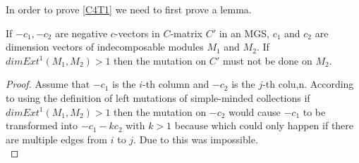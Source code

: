 \indent In order to prove \ref{C4T1} we need to first prove a lemma.
\begin{lemma}\label{C4L}
\indent If $-c_1, -c_2$ are negative $c$-vectors in $C$-matrix $C'$ in an MGS, $c_1$ and $c_2$ are dimension vectors of indecomposable modules $M_1$ and $M_2$. If $dim Ext^1(M_1, M_2) > 1$ then the mutation on $C'$ must not be done on $M_2$.
\end{lemma}
\begin{proof}
Assume that $-c_1$ is the $i$-th column and $-c_2$ is the $j$-th colu,n. According to \cite{KY12} using the definition of left mutations of simple-minded collections if $dim Ext^1(M_1, M_2) > 1$ then the mutation on $-c_2$ would cause $-c_1$ to be transformed into $-c_1-kc_2$ with $k>1$ because which could only happen if there are multiple edges from $i$ to $j$. Due to \cite{BHIT15} this was impossible.\\
\end{proof}
